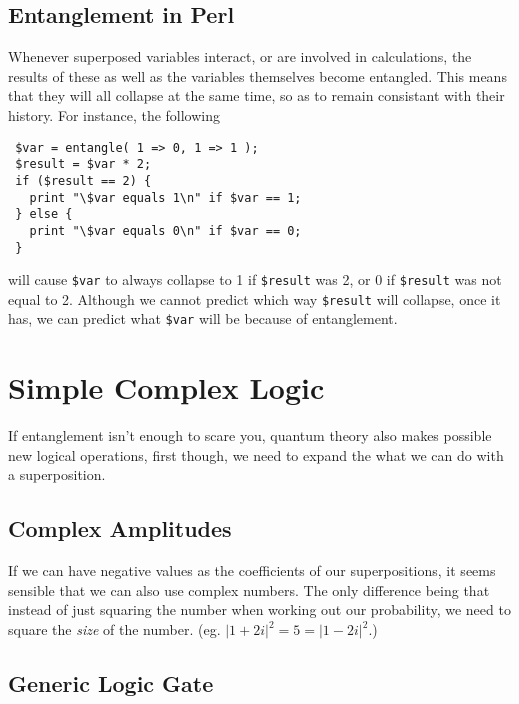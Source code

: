 \documentclass{article}      %
\newcommand{\pvar}[1]{\texttt{\$#1}} %
\begin{document}
\subsection{Entanglement in Perl}

Whenever superposed variables interact, or are involved in
calculations, the results of these as well as the variables
themselves become entangled.  This means that they will all collapse
at the same time, so as to remain consistant with their history.  For
instance, the following
\begin{verbatim}
 $var = entangle( 1 => 0, 1 => 1 );
 $result = $var * 2;
 if ($result == 2) {
   print "\$var equals 1\n" if $var == 1;
 } else {
   print "\$var equals 0\n" if $var == 0;
 }
\end{verbatim}
will cause \pvar{var} to always collapse to 1 if \pvar{result} was 2, or 0 if
\pvar{result} was not equal to 2.  Although we cannot predict which
way \pvar{result} will collapse, once it has, we can predict what
\pvar{var} will be because of entanglement.

\section{Simple Complex Logic}

If entanglement isn't enough to scare you, quantum theory also makes
possible new logical operations, first though, we need to expand the
what we can do with a superposition.

\subsection{Complex Amplitudes}

If we can have negative values as the coefficients of our
superpositions, it seems sensible that we can also use complex
numbers.  The only difference being that instead of just squaring the
number when working out our probability, we need to square the
\emph{size} of the number.  (eg. $|1+2i|^2 = 5 =|1-2i|^2$.)

\subsection{Generic Logic Gate}
\end{document}
